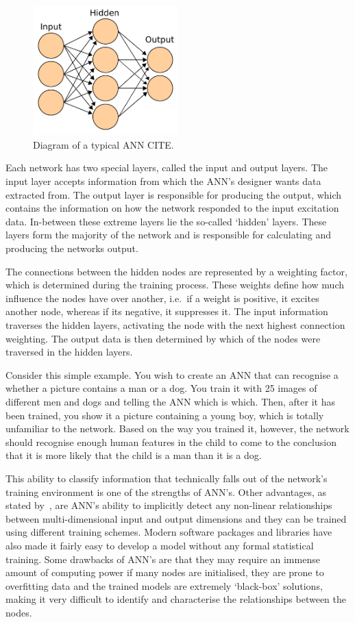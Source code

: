 \begin{figure}
  \centering
  \includegraphics[width=0.5\textwidth]{figures/chapter2/ANN_diagram}
  \caption{Diagram of a typical ANN CITE.}
\label{fig:chap2-ann-layout}
\end{figure}

Each network has two special layers, called the input and output layers. The input layer accepts information from which the ANN's designer wants data extracted from. The output layer is responsible for producing the output, which contains the information on how the network responded to the input excitation data. In-between these extreme layers lie the so-called `hidden' layers. These layers form the majority of the network and is responsible for calculating and producing the networks output.

The connections between the hidden nodes are represented by a weighting factor, which is determined during the training process. These weights define how much influence the nodes have over another, i.e.\ if a weight is positive, it excites another node, whereas if its negative, it suppresses it. The input information traverses the hidden layers, activating the node with the next highest connection weighting. The output data is then determined by which of the nodes were traversed in the hidden layers.

Consider this simple example. You wish to create an ANN that can recognise a whether a picture contains a man or a dog. You train it with 25 images of different men and dogs and telling the ANN which is which. Then, after it has been trained, you show it a picture containing a young boy, which is totally unfamiliar to the network. Based on the way you trained it, however, the network should recognise enough human features in the child to come to the conclusion that it is more likely that the child is a man than it is a dog. 

This ability to classify information that technically falls out of the network's training environment is one of the strengths of ANN's. Other advantages, as stated by~\cite{tu1996advantages}, are ANN's ability to implicitly detect any non-linear relationships between multi-dimensional input and output dimensions and they can be trained using different training schemes. Modern software packages and libraries have also made it fairly easy to develop a model without any formal statistical training. Some drawbacks of ANN's are that they may require an immense amount of computing power if many nodes are initialised, they are prone to overfitting data and the trained models are extremely `black-box' solutions, making it very difficult to identify and characterise the relationships between the nodes. 

